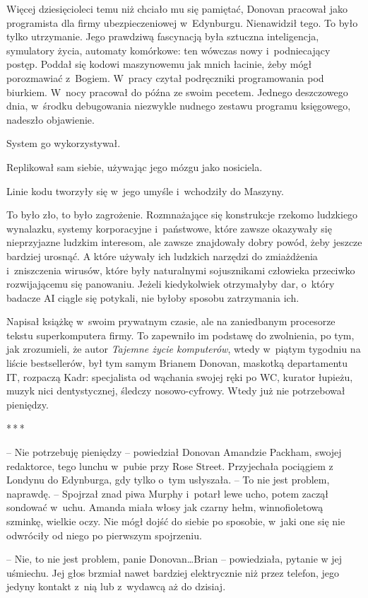 \documentclass[oneside,polish,11pt,sfheadings]{mwbk}
\newcommand{\threeast}{\bigskip\par\centerline{*\,*\,*}\medskip\par}%
\begin{document}
Więcej dziesięcioleci temu niż chciało mu się pamiętać, Donovan pracował
jako programista dla firmy ubezpieczeniowej w~Edynburgu. Nienawidził
tego. To było tylko utrzymanie. Jego prawdziwą fascynacją była sztuczna
inteligencja, symulatory życia, automaty komórkowe: ten wówczas nowy i~podniecający postęp. Poddał się kodowi maszynowemu jak mnich łacinie,
żeby mógł porozmawiać z~Bogiem. W~pracy czytał podręczniki programowania
pod biurkiem. W~nocy pracował do późna ze swoim pecetem. Jednego
deszczowego dnia, w~środku debugowania niezwykle nudnego zestawu
programu księgowego, nadeszło objawienie.

System go wykorzystywał.

Replikował sam siebie, używając jego mózgu jako nosiciela.

Linie kodu tworzyły się w~jego umyśle i~wchodziły do Maszyny.

To było zło, to było zagrożenie. Rozmnażające się konstrukcje rzekomo
ludzkiego wynalazku, systemy korporacyjne i~państwowe, które zawsze
okazywały się nieprzyjazne ludzkim interesom, ale zawsze znajdowały
dobry powód, żeby jeszcze bardziej urosnąć. A które używały ich ludzkich
narzędzi do zmiażdżenia i~zniszczenia wirusów, które były naturalnymi
sojusznikami człowieka przeciwko rozwijającemu się panowaniu. Jeżeli
kiedykolwiek otrzymałyby dar, o~który badacze AI ciągle się potykali,
nie byłoby sposobu zatrzymania ich.

Napisał książkę w~swoim prywatnym czasie, ale na zaniedbanym procesorze
tekstu superkomputera firmy. To zapewniło im podstawę do zwolnienia, po
tym, jak zrozumieli, że autor \emph{Tajemne życie komputerów}, wtedy w~piątym tygodniu na liście bestsellerów, był tym samym Brianem Donovan,
maskotką departamentu IT, rozpaczą Kadr: specjalista od wąchania swojej
ręki po WC, kurator łupieżu, muzyk nici dentystycznej, śledczy
nosowo-cyfrowy. Wtedy już nie potrzebował pieniędzy.
  \threeast 

-- Nie potrzebuję pieniędzy -- powiedział Donovan Amandzie Packham, swojej
redaktorce, tego lunchu w~pubie przy Rose Street. Przyjechała pociągiem
z Londynu do Edynburga, gdy tylko o~tym usłyszała. -- To nie jest
problem, naprawdę. -- Spojrzał znad piwa Murphy i~potarł lewe ucho, potem
zaczął sondować w~uchu. Amanda miała włosy jak czarny hełm,
winnofioletową szminkę, wielkie oczy. Nie mógł dojść do siebie po
sposobie, w~jaki one się nie odwróciły od niego po pierwszym spojrzeniu.

-- Nie, to nie jest problem, panie Donovan\ldots Brian -- powiedziała, pytanie
w jej uśmiechu. Jej głos brzmiał nawet bardziej elektrycznie niż przez
telefon, jego jedyny kontakt z~nią lub z~wydawcą aż do dzisiaj.
\end{document}
